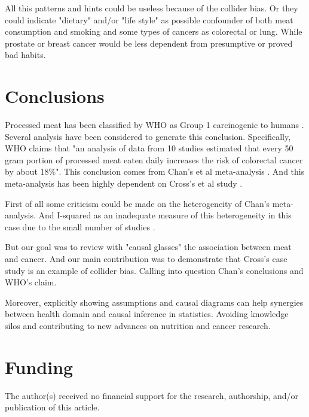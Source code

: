 \documentclass{article}
\begin{document}
All this patterns and hints could be useless because of the collider bias. Or they could indicate "dietary" and/or "life style" as possible confounder of both meat consumption and smoking and some types of cancers as colorectal or lung. While prostate or breast cancer would be less dependent from presumptive or proved bad habits. %


\section{Conclusions}

Processed meat has been classified by WHO as Group 1 carcinogenic to humans \cite{whoint}. Several analysis have been considered to generate this conclusion. Specifically, WHO claims that "an analysis of data from 10 studies estimated that every 50 gram portion of processed meat eaten daily increases the risk of colorectal cancer by about 18\%". This conclusion comes from Chan's et al meta-analysis \cite{chan}. And this meta-analysis has been highly dependent on Cross's et al study \cite{cross}.

First of all some criticism could be made on the heterogeneity of Chan's meta-analysis. And I-squared as an inadequate measure of this heterogeneity in this case due to the small number of studies \cite{hippel}.

But our goal was to review with "causal glasses" the association between meat and cancer. And our main contribution was to demonstrate that Cross's case study is an example of collider bias. Calling into question Chan's conclusions and WHO's claim.

Moreover, explicitly showing assumptions and causal diagrams can help synergies between health domain and causal inference in statistics. Avoiding knowledge silos and contributing to new advances on nutrition and cancer research.


\section{Funding}
The author(s) received no financial support for the research, authorship, and/or publication of this article.


\end{document}
